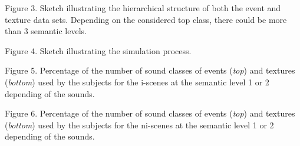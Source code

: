 \documentclass[12pt, titlepage, reqno]{article} %
\begin{document}
  \smallskip
  
 
 \noindent
 Figure 3.  Sketch illustrating  the hierarchical structure of both the event and texture data sets. Depending on the considered top class, there could be more than 3 semantic levels.
 
 \smallskip
 
 \noindent
 Figure 4.   Sketch illustrating the simulation process. 
 \smallskip
 
 \noindent
 Figure 5. Percentage of the number of sound classes of events (\textit{top}) and textures (\textit{bottom}) used by the subjects for the i-scenes at the semantic level 1 or 2 depending of the sounds.
 
 \smallskip
 
 \noindent
 Figure 6.   Percentage of the number of sound classes of events (\textit{top}) and textures (\textit{bottom}) used by the subjects for the ni-scenes at the semantic level 1 or 2 depending of the sounds.  
 \smallskip
 
\end{document}
